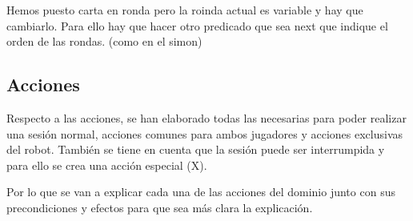 \documentclass{uc3mpracticas}
\begin{document}
  Hemos puesto carta en ronda pero la roinda actual es variable y hay que cambiarlo. Para ello hay que hacer otro predicado que sea next que indique el orden de las rondas. (como en el simon)


  \subsection{Acciones}

  Respecto a las acciones, se han elaborado todas las necesarias para poder realizar una sesión normal, acciones comunes para ambos jugadores y acciones exclusivas del robot. También se tiene en cuenta que la sesión puede ser interrumpida y para ello se crea una acción especial (X).

  \vspace{2mm}

  Por lo que se van a explicar cada una de las acciones del dominio junto con sus precondiciones y efectos para que sea más clara la explicación.
\end{document}
